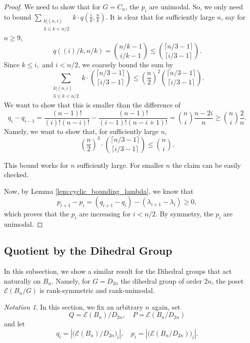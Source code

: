 \documentclass[10 pt]{amsart}
\theoremstyle{plain}
\theoremstyle{definition}
\theoremstyle{remark}
\newtheorem{note}[thm]{Notation}
\numberwithin{equation}{section}
\newcommand\ssec{\subsection}
\newcommand{\dstyle}{\displaystyle}
\begin{document}
\begin{proof}
We need to show that for $G= C_n$, the $p_i$ are unimodal. So, we only need to bound $ \dstyle \sum_{\substack{k | (n , i)\\ 3 \le k < n/2 }} k \cdot q (\frac{i}{k}, \frac{n}{k}) $. It is clear that for sufficiently large $n$, say for $n \ge 9$, $$q((i)/k, n/k) = {n/k - 1 \choose i/k -1} \le {\lceil n/3-1 \rceil \choose \lceil i/3 -1 \rceil }.$$ Since $k \leq i,$ and $ i < n/2$, we coarsely bound the sum by $$\sum_{\substack{k | (n , i)\\ 3 \le k < n/2 }} k  \cdot {\lceil n/3-1 \rceil \choose \lceil i/3 -1 \rceil } \le \left(\frac{n}{2}\right)^2  {\lceil n/3-1 \rceil \choose \lceil i/3 -1 \rceil }. $$ We want to show that this is smaller than the difference of $$q_i - q_{i-1} = \frac{(n-1)!}{(i)! (n-i)!} - \frac{(n-1)!}{(i-1)!(n-i+1)!}= {n \choose i } \frac{n-2i}{n} \ge  {n \choose i } \frac{2}{n} .$$
Namely, we want to show that, for sufficiently large $n$, 
$$ \left(\frac{n}{2}\right)^3 \cdot {\lceil n/3-1 \rceil \choose \lceil i/3 -1 \rceil }  \le   {n \choose i}.$$

This bound works for $n$ sufficiently large. For smaller $n$ the claim can be easily checked. 

Now, by Lemma \ref{lem:cyclic_bounding_lambda}, we know that $$p_{i+1} - p_{i} =  (q_{i+1} - q_i) - (\lambda_{i+1}- \lambda_i) \ge 0,$$  which proves that the $p_i$ are increasing for $i < n/2$. By symmetry, the $p_i$ are unimodal.
\end{proof}






\ssec{Quotient by the Dihedral Group}
\label{ssec:dihedral}

In this subsection, we show a similar result for the Dihedral groups that act naturally on $B_n$. Namely, for $G = D_{2n}$ the dihedral group of order $2n$, the poset $\mathcal E(B_n/G)$ is rank-symmetric and rank-unimodal.


\begin{note} In this section, we fix an arbitrary $n$ again, set $$Q = \mathcal E (B_n)/D_{2n}, \quad P = \mathcal E(B_n/D_{2n})$$ and let $$q_i = |\big( \mathcal E (B_n)/D_{2n} \big)_i|, \quad p_i = |\big( \mathcal E(B_n/D_{2n}) \big)_i|. $$ 
\end{note}

\building*
\end{document}
